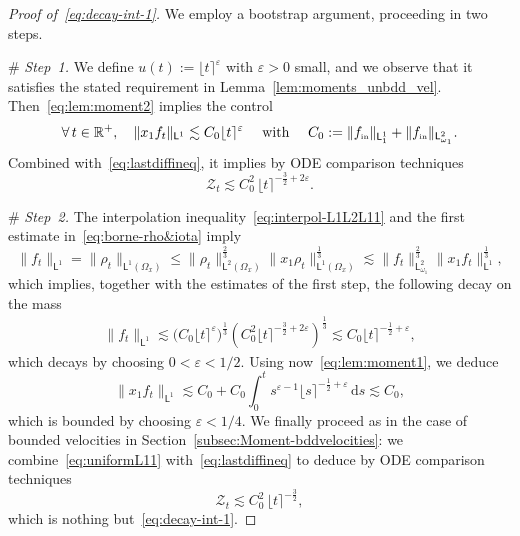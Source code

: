 \documentclass[11pt]{amsart}
\theoremstyle{definition}
\theoremstyle{remark}
\numberwithin{equation}{section}
\def\eps{{\varepsilon}}
\newcommand\R{{\mathbb R}}
\def\ZZ{{\mathcal Z}}
\newcommand{\dd}{{\, \mathrm d}}
\newcommand{\init}{\text{{\tiny {\rm in}}}}
\newcommand{\sfL}{\mathsf{L}}
\newcommand{\wangle}[1]{\lfloor #1 \rceil}
\begin{document}
\begin{proof}[Proof of~\eqref{eq:decay-int-1}]
  We employ a bootstrap argument, proceeding in two steps.

  \smallskip\noindent
  {\# \sl Step~1.}  We define $u(t) := \wangle{t}^{\eps}$ with $\eps > 0$ small, and we observe that  it satisfies the stated requirement in Lemma~\ref{lem:moments_unbdd_vel}. Then~\eqref{eq:lem:moment2} implies the control
  \begin{equation*}
    \forall \, t \in \R^+, \quad \| x_1 f_t\|_{\sfL^1} \lesssim C_0 \wangle{t}^{\eps} \quad \mbox{ with } \quad C_0 :=  \| f_\init \|_{\sfL^{1}_{1}} +  \| f_\init\|_{\sfL^2_{\omega_1}}.
  \end{equation*}
  Combined with~\eqref{eq:lastdiffineq}, it implies by ODE comparison techniques
  \begin{equation}
    \label{eq:NotOptimalDecay}
    \ZZ_t \lesssim C_0^2 \,  \wangle{t}^{ - \frac{3}2 + 2 \eps}.
  \end{equation}

  \smallskip\noindent
  {\# \sl Step~2.} The interpolation inequality~\eqref{eq:interpol-L1L2L11} and the first estimate in~\eqref{eq:borne-rho&iota} imply
  \begin{equation*}
    \| f_t \|_{\sfL^{1}}  = \| \rho_t \|_{\sfL^{1}(\Omega_x)} \le \| \rho_t \|_{\sfL^{2}(\Omega_x)}^{\frac{2}{3}} \| x_1 \rho_t\|_{\sfL^{1}(\Omega_x)}^{\frac{1}{3}} \lesssim \|f_t\|_{\sfL^2_{\omega_1}}^{\frac{2}{3}} \| x_1 f_t \|_{\sfL^1}^{\frac{1}{3}},
  \end{equation*}
  which implies, together with the estimates of the first step, the following decay on the mass
  \begin{align*}
    \| f_t \|_{\sfL^{1}} \lesssim \big( C_0 \wangle{t}^{\eps} \big)^{\frac{1}{3}} \left( C_0^2  \wangle{t}^{-\frac{3}2 + 2 \eps} \right)^{\frac{1}{3}} \lesssim C_0  \wangle{t}^{- \frac{1}2 +  \eps},
  \end{align*}
  which decays by choosing $0 < \eps < 1/2$. Using now~\eqref{eq:lem:moment1}, we deduce
  \begin{equation}
    \label{eq:uniformL11}
    \| x_1 f_t \|_{\sfL^{1}} \lesssim C_0 + C_0\int_0^t s^{\eps-1} \wangle{s}^{- \frac{1}2 +  \eps} \dd s \lesssim C_0,
  \end{equation}
  which is bounded by choosing $\eps < 1/4$. We finally proceed as in the case of bounded velocities in Section~\ref{subsec:Moment-bddvelocities}: we combine~\eqref{eq:uniformL11} with~\eqref{eq:lastdiffineq} to deduce by ODE comparison techniques
  \begin{equation}\label{eq:weakZ2}
    \ZZ_t \lesssim C_0^2 \,  \wangle{t}^{- \frac{3}2},
  \end{equation}
  which is nothing but~\eqref{eq:decay-int-1}.
\end{proof}
\end{document}
